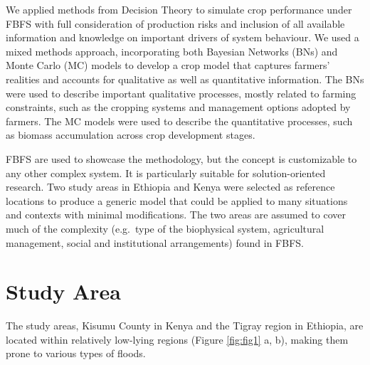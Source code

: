 \documentclass[]{elsarticle} %
\begin{document}
We applied methods from Decision Theory to simulate crop performance under FBFS with full consideration of production risks and inclusion of all available information and knowledge on important drivers of system behaviour. We used a mixed methods approach, incorporating both Bayesian Networks (BNs) and Monte Carlo (MC) models to develop a crop model that captures farmers' realities and accounts for qualitative as well as quantitative information. The BNs were used to describe important qualitative processes, mostly related to farming constraints, such as the cropping systems and management options adopted by farmers. The MC models were used to describe the quantitative processes, such as biomass accumulation across crop development stages.

FBFS are used to showcase the methodology, but the concept is customizable to any other complex system. It is particularly suitable for solution-oriented research. Two study areas in Ethiopia and Kenya were selected as reference locations to produce a generic model that could be applied to many situations and contexts with minimal modifications. The two areas are assumed to cover much of the complexity (e.g.~type of the biophysical system, agricultural management, social and institutional arrangements) found in FBFS.

\hypertarget{ref2}{%
\section{Study Area}\label{ref2}}

The study areas, Kisumu County in Kenya and the Tigray region in Ethiopia, are located within relatively low-lying regions (Figure \ref{fig:fig1} a, b), making them prone to various types of floods.
\end{document}
